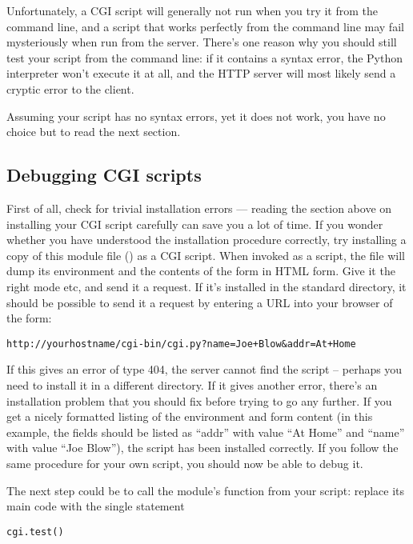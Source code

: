 Unfortunately, a CGI script will generally not run when you try it
from the command line, and a script that works perfectly from the
command line may fail mysteriously when run from the server.  There's
one reason why you should still test your script from the command
line: if it contains a syntax error, the Python interpreter won't
execute it at all, and the HTTP server will most likely send a cryptic
error to the client.

Assuming your script has no syntax errors, yet it does not work, you
have no choice but to read the next section.


\subsection{Debugging CGI scripts}

First of all, check for trivial installation errors --- reading the
section above on installing your CGI script carefully can save you a
lot of time.  If you wonder whether you have understood the
installation procedure correctly, try installing a copy of this module
file () as a CGI script.  When invoked as a script, the file
will dump its environment and the contents of the form in HTML form.
Give it the right mode etc, and send it a request.  If it's installed
in the standard  directory, it should be possible to send it a
request by entering a URL into your browser of the form:

\begin{verbatim}
http://yourhostname/cgi-bin/cgi.py?name=Joe+Blow&addr=At+Home
\end{verbatim}

If this gives an error of type 404, the server cannot find the script
-- perhaps you need to install it in a different directory.  If it
gives another error, there's an installation problem that
you should fix before trying to go any further.  If you get a nicely
formatted listing of the environment and form content (in this
example, the fields should be listed as ``addr'' with value ``At Home''
and ``name'' with value ``Joe Blow''), the  script has been
installed correctly.  If you follow the same procedure for your own
script, you should now be able to debug it.

The next step could be to call the  module's
 function from your script: replace its main code
with the single statement

\begin{verbatim}
cgi.test()
\end{verbatim}

